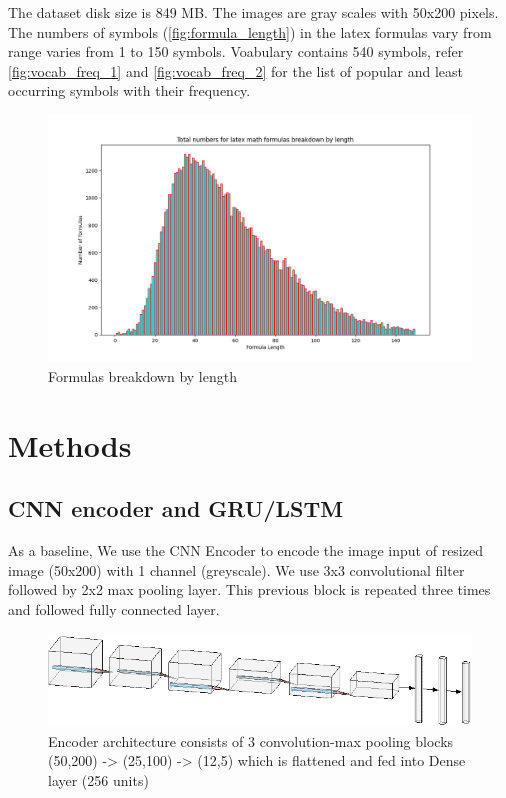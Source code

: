 \documentclass{article}
\begin{document}
 The dataset disk size is 849 MB. The images are gray scales with 50x200 pixels. The numbers of symbols (\autoref{fig:formula_length}) in the latex formulas vary from range varies from 1 to 150 symbols. Voabulary contains 540 symbols, refer \autoref{fig:vocab_freq_1} and \autoref{fig:vocab_freq_2} for the list of popular and least occurring symbols with their frequency.
 
\begin{figure}[H]
    \centering
    \includegraphics[scale=0.4]{fig_latex_formula_length.png}
    \caption{Formulas breakdown by length}
    \label{fig:formula_length}
\end{figure}

\section{Methods}

\subsection{CNN encoder and GRU/LSTM}
As a baseline, We use the CNN Encoder to encode the image input of resized image (50x200) with 1 channel (greyscale). We use 3x3 convolutional filter followed by 2x2 max pooling layer. This previous block is repeated three times and followed fully connected layer.

\begin{figure}[H]
    \centering
    \includegraphics[scale=0.6]{cnn_architecture.png}
    \caption{Encoder architecture consists of 3 convolution-max pooling blocks (50,200) -> (25,100) -> (12,5) which is flattened and fed into Dense layer (256 units)  }	
    \label{fig:cnn_lstm}
\end{figure}
\end{document}
